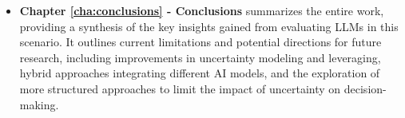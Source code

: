 \begin{itemize}
  \item \textbf{Chapter \ref{cha:conclusions} - Conclusions} summarizes the
    entire work, providing a synthesis of the key insights gained from evaluating
    LLMs in this scenario. It outlines current limitations and potential
    directions for future research, including improvements in uncertainty modeling
    and leveraging, hybrid approaches integrating different AI models, and the exploration
    of more structured approaches to limit the impact of uncertainty on decision-making.
\end{itemize}